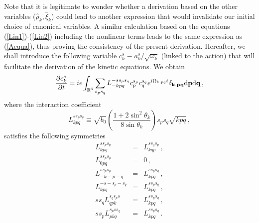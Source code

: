 \documentclass{jpp}
\def\be{\begin{equation}}
\def\ee{\end{equation}}
\def\ba{\begin{eqnarray}}
\def\ea{\end{eqnarray}}
\def\kk{{\bf k}}
\def\pp{{\bf p}}
\def\qq{{\bf q}}
\def\dd{\mathrm{d}}
\begin{document}
Note that it is legitimate to wonder whether a derivation based on the other variables ($\hat \rho_k, \hat \xi_k$) could lead to another expression that would invalidate our initial choice of canonical variables. A similar calculation based on the equations (\ref{Lin1})-(\ref{Lin2}) including the nonlinear terms leads to the same expression as (\ref{Aequa}), thus proving the consistency of the present derivation. 
Hereafter, we shall introduce the following variable $c_k^s \equiv a_k^s /\sqrt{\omega_k}$ (linked to the action) that will facilitate the derivation of the kinetic equations. We obtain
\be
{\partial c_k^s \over \partial t} = i \epsilon \int_{\mathbb{R}^6} \sum_{s_p s_q} L_{-kpq}^{-ss_ps_q} 
c_p^{s_p} c_q^{s_q} e^{i\Omega_{k,pq} t} \delta_{\kk,\pp\qq} \dd \pp \dd \qq \, , \label{Aequa2}
\ee
where the interaction coefficient
\be
L_{kpq}^{ss_ps_q} \equiv  \sqrt{b_0}  \left(\frac{1 + 2 \sin^2 \theta_k}{8 \sin \theta_k}\right) s_p s_q \sqrt{kpq} \, ,
\ee
satisfies the following symmetries
\ba
L_{kpq}^{ss_{p}s_{q}} &=& L_{kqp}^{ss_{q}s_{p}} \, , \\
L_{0pq}^{ss_{p}s_{q}} &=& 0 \, , \\
L_{-k-p-q}^{ss_{p}s_{q}} &=& L_{kpq}^{ss_{p}s_{q}} \, , \\
L_{kpq}^{-s-s_{p}-s_{q}} &=& L_{kpq}^{ss_{p}s_{q}} \, , \\
ss_{q} L_{qpk}^{s_{q}s_{p}s} &=& L_{kpq}^{ss_{p}s_{q}} \, , \\
ss_{p} L_{pkq}^{s_{p}ss_{q}} &=& L_{kpq}^{ss_{p}s_{q}} \, .
\ea


\end{document}
